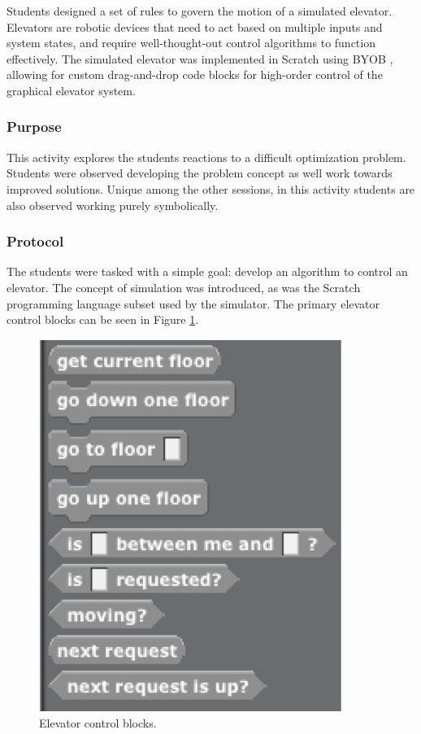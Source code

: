 	Students designed a set of rules to govern the motion of a simulated
	elevator. Elevators are robotic devices that need to act based on
	multiple inputs and system states, and require well-thought-out control
	algorithms to function effectively. The simulated elevator was
	implemented in Scratch \citet{scratch} using BYOB \citet{byob},
	allowing for custom drag-and-drop code blocks for high-order control
	of the graphical elevator system.
	
	
	\subsubsection{Purpose}
	
	This activity explores the students reactions to a difficult optimization
	problem. Students were observed developing the problem concept
	as well work towards improved solutions. Unique among the other sessions,
	in this activity students are also observed working purely symbolically.
	
	
	\subsubsection{Protocol}
	
	The students were tasked with a simple goal: develop an algorithm
	to control an elevator. The concept of simulation was introduced,
	as was the Scratch programming language subset used by the simulator.
	The primary elevator control blocks can be seen in Figure \ref{fig:Elevator-blocks}.
	
	\begin{figure}
	\begin{centering}
	\includegraphics{images/elevator_primitives}
	\par\end{centering}
	
	\caption{\label{fig:Elevator-blocks}Elevator control blocks.}
	
	
	
	\end{figure}
	
